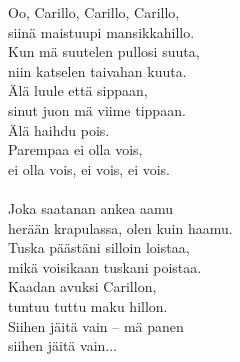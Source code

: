 
Oo, Carillo, Carillo, Carillo, \\ siinä maistuupi mansikkahillo. \\ Kun mä suutelen pullosi suuta, \\ niin katselen taivahan kuuta. \\ Älä luule että sippaan, \\ sinut juon mä viime tippaan. \\ Älä haihdu pois. \\ Parempaa ei olla vois, \\ ei olla vois, ei vois, ei vois. \\ \hspace{10mm} \\ Joka saatanan ankea aamu \\ herään krapulassa, olen kuin haamu. \\ Tuska päästäni silloin loistaa, \\ mikä voisikaan tuskani poistaa. \\ Kaadan avuksi Carillon, \\ tuntuu tuttu maku hillon. \\ Siihen jäitä vain -- mä panen \\ siihen jäitä vain...